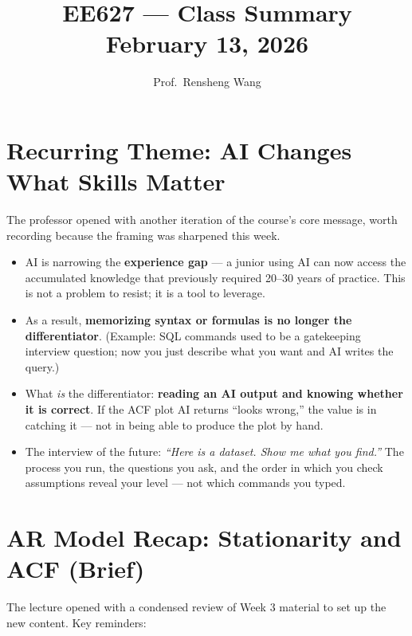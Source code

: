 \documentclass[11pt]{article}
\title{\textbf{EE627 --- Class Summary}\\[0.4em]
       \large February 13, 2026}
\author{Prof.\ Rensheng Wang}
\date{}
\begin{document}
\maketitle
\tableofcontents
\newpage

\section{Recurring Theme: AI Changes What Skills Matter}

The professor opened with another iteration of the course's core message,
worth recording because the framing was sharpened this week.

\begin{itemize}
    \item AI is narrowing the \textbf{experience gap} --- a junior using AI can
      now access the accumulated knowledge that previously required 20--30 years
      of practice. This is not a problem to resist; it is a tool to leverage.
    \item As a result, \textbf{memorizing syntax or formulas is no longer the
      differentiator}. (Example: SQL commands used to be a gatekeeping
      interview question; now you just describe what you want and AI writes
      the query.)
    \item What \emph{is} the differentiator: \textbf{reading an AI output and
      knowing whether it is correct}. If the ACF plot AI returns ``looks
      wrong,'' the value is in catching it --- not in being able to produce
      the plot by hand.
    \item The interview of the future: \textit{``Here is a dataset. Show me
      what you find.''} The process you run, the questions you ask, and the
      order in which you check assumptions reveal your level --- not which
      commands you typed.
\end{itemize}


\section{AR Model Recap: Stationarity and ACF (Brief)}

The lecture opened with a condensed review of Week 3 material to set up
the new content. Key reminders:
\end{document}
